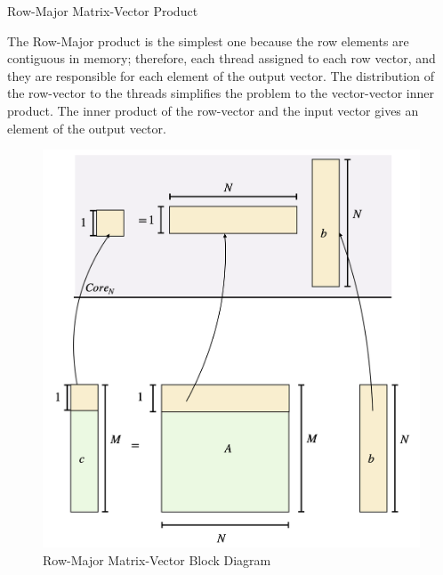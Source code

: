 \begin{algorithm}[H]
    \SetAlgoLined


    \caption{Row-Major Matrix-Vector Product}
\end{algorithm}

The Row-Major product is the simplest one because the row elements 
are contiguous in memory; therefore, each thread assigned to each 
row vector, and they are responsible for each element of the output 
vector. The distribution of the row-vector to the threads simplifies 
the problem to the vector-vector inner product. The inner product of 
the row-vector and the input vector gives an element of the output vector.

\begin{figure}[htb]
    \centering
    \caption{Row-Major Matrix-Vector Block Diagram}
    \includegraphics[width=15cm]{../assets/mtv/row_major/block_diagram.png} %
\end{figure}

